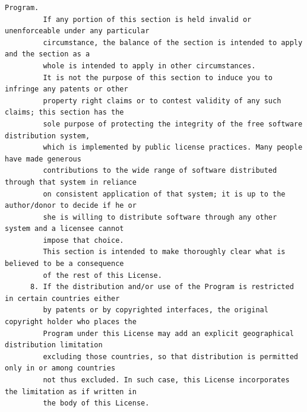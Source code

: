 \begin{lstlisting}[basicstyle=\ttfamily\footnotesize,breaklines=true]
         Program.
         If any portion of this section is held invalid or unenforceable under any particular
         circumstance, the balance of the section is intended to apply and the section as a
         whole is intended to apply in other circumstances.
         It is not the purpose of this section to induce you to infringe any patents or other
         property right claims or to contest validity of any such claims; this section has the
         sole purpose of protecting the integrity of the free software distribution system,
         which is implemented by public license practices. Many people have made generous
         contributions to the wide range of software distributed through that system in reliance
         on consistent application of that system; it is up to the author/donor to decide if he or
         she is willing to distribute software through any other system and a licensee cannot
         impose that choice.
         This section is intended to make thoroughly clear what is believed to be a consequence
         of the rest of this License.
      8. If the distribution and/or use of the Program is restricted in certain countries either
         by patents or by copyrighted interfaces, the original copyright holder who places the
         Program under this License may add an explicit geographical distribution limitation
         excluding those countries, so that distribution is permitted only in or among countries
         not thus excluded. In such case, this License incorporates the limitation as if written in
         the body of this License.





\end{lstlisting}
